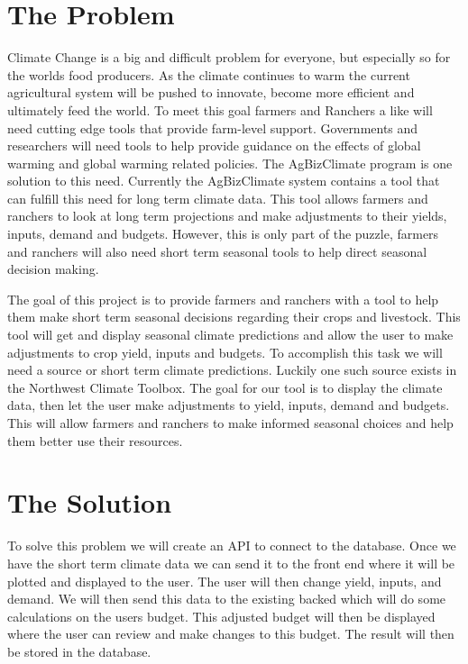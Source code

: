 \documentclass[letterpaper,10pt]{article}
\begin{document}
\section{The Problem}

	Climate Change is a big and difficult problem for everyone, but especially so for the worlds food producers. As the climate continues to warm the current agricultural system will be pushed to innovate, become more efficient and ultimately feed the world. To meet this goal farmers and Ranchers a like will need cutting edge tools that provide farm-level support. Governments and researchers will need tools to help provide guidance on the effects of global warming and global warming related policies. The AgBizClimate program is one solution to this need. Currently the AgBizClimate system contains a tool that can fulfill this need for long term climate data. This tool allows farmers and ranchers to look at long term projections and make adjustments to their yields, inputs, demand and budgets. However, this is only part of the puzzle, farmers and ranchers will also need short term seasonal tools to help direct seasonal decision making.
		
	The goal of this project is to provide farmers and ranchers with a tool to help them make short term seasonal decisions regarding their crops and livestock. This tool will get and display seasonal climate predictions and allow the user to make adjustments to crop yield, inputs and budgets. To accomplish this task we will need a source or short term climate predictions. Luckily one such source exists in the Northwest Climate Toolbox. The goal for our tool is to display the climate data, then let the user make adjustments to yield, inputs, demand and budgets. This will allow farmers and ranchers to make informed seasonal choices and help them better use their resources.

\section{The Solution}

	To solve this problem we will create an API to connect to the database. Once we have the short term climate data we can send it to the front end where it will be plotted and displayed to the user. The user will then change yield, inputs, and demand. We will then send this data to the existing backed which will do some calculations on the users budget. This adjusted budget will then be displayed where the user can review and make changes to this budget. The result will then be stored in the database.
	
\end{document}

